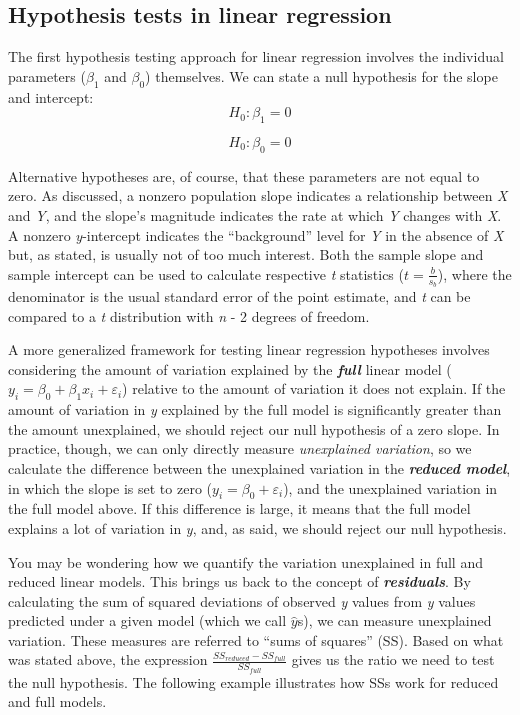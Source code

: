 \documentclass[
]{book}
\begin{document}
\hypertarget{hypothesis-tests-in-linear-regression}{%
\subsection{Hypothesis tests in linear regression}\label{hypothesis-tests-in-linear-regression}}

The first hypothesis testing approach for linear regression involves the individual parameters (\(\beta_1\) and \(\beta_0\)) themselves. We can state a null hypothesis for the slope and intercept:
\[H_0:  \beta_1=0\]

\[H_0:  \beta_0=0\]

Alternative hypotheses are, of course, that these parameters are not equal to zero. As discussed, a nonzero population slope indicates a relationship between \emph{X} and \emph{Y}, and the slope's magnitude indicates the rate at which \emph{Y} changes with \emph{X}. A nonzero \emph{y}-intercept indicates the ``background'' level for \emph{Y} in the absence of \emph{X} but, as stated, is usually not of too much interest. Both the sample slope and sample intercept can be used to calculate respective \emph{t} statistics (\(t=\frac{b}{s_b}\)), where the denominator is the usual standard error of the point estimate, and \emph{t} can be compared to a \emph{t} distribution with \emph{n} - 2 degrees of freedom.

A more generalized framework for testing linear regression hypotheses involves considering the amount of variation explained by the \textbf{\emph{full}} linear model (\(y_i=\beta_0+\beta_1x_i+\varepsilon_i\)) relative to the amount of variation it does not explain. If the amount of variation in \emph{y} explained by the full model is significantly greater than the amount unexplained, we should reject our null hypothesis of a zero slope. In practice, though, we can only directly measure \emph{unexplained variation}, so we calculate the difference between the unexplained variation in the \textbf{\emph{reduced model}}, in which the slope is set to zero (\(y_i=\beta_0+\varepsilon_i\)), and the unexplained variation in the full model above. If this difference is large, it means that the full model explains a lot of variation in \emph{y}, and, as said, we should reject our null hypothesis.

You may be wondering how we quantify the variation unexplained in full and reduced linear models. This brings us back to the concept of \textbf{\emph{residuals}}. By calculating the sum of squared deviations of observed \emph{y} values from \emph{y} values predicted under a given model (which we call \(\hat{y}\)s), we can measure unexplained variation. These measures are referred to ``sums of squares'' (SS). Based on what was stated above, the expression \(\frac{SS_{reduced}-SS_{full}}{SS_{full}}\) gives us the ratio we need to test the null hypothesis. The following example illustrates how SSs work for reduced and full models.
\end{document}
